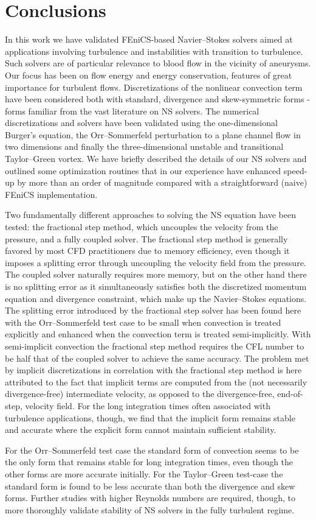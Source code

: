\section{Conclusions}

In this work we have validated FEniCS-based Navier--Stokes solvers
aimed at applications involving turbulence and instabilities with
transition to turbulence. Such solvers are of particular relevance
to blood flow in the vicinity of aneurysms.  Our focus has been on
flow energy and energy conservation, features of great importance for
turbulent flows. Discretizations of the nonlinear convection term have
been considered both with standard, divergence and skew-symmetric forms
- forms familiar from the vast literature on NS solvers. The numerical
discretizations and solvers have been validated using the one-dimensional
Burger's equation, the Orr--Sommerfeld perturbation to a plane channel
flow in two dimensions and finally the three-dimensional unstable and
transitional Taylor--Green vortex. We have briefly described the details
of our NS solvers and outlined some optimization routines that in our
experience have enhanced speed-up by more than an order of magnitude
compared with a straightforward (naive) FEniCS implementation.

Two fundamentally different approaches to solving the NS equation have
been tested: the fractional step method, which uncouples the velocity
from the pressure, and a fully coupled solver. The fractional step
method is generally favored by most CFD practitioners due to memory
efficiency, even though it imposes a splitting error through uncoupling
the velocity field from the pressure. The coupled solver naturally
requires more memory, but on the other hand there is no splitting
error as it simultaneously satisfies both the discretized momentum
equation and divergence constraint, which make up the Navier--Stokes
equations. The splitting error introduced by the fractional step solver
has been found here with the Orr--Sommerfeld test case to be small
when convection is treated explicitly and enhanced when the convection
term is treated semi-implicitly. With semi-implicit convection the
fractional step method requires the CFL number to be half that of the
coupled solver to achieve the same accuracy. The problem met by implicit
discretizations in correlation with the fractional step method is here
attributed to the fact that implicit terms are computed from the (not
necessarily divergence-free) intermediate velocity, as opposed to the
divergence-free, end-of-step, velocity field. For the long integration
times often associated with turbulence applications, though, we find
that the implicit form remains stable and accurate where the explicit
form cannot maintain sufficient stability.

For the Orr--Sommerfeld test case the standard form of convection seems
to be the only form that remains stable for long integration times, even
though the other forms are more accurate initially. For the Taylor--Green
test-case the standard form is found to be less accurate than both the
divergence and skew forms. Further studies with higher Reynolds numbers
are required, though, to more thoroughly validate stability of NS solvers
in the fully turbulent regime.

